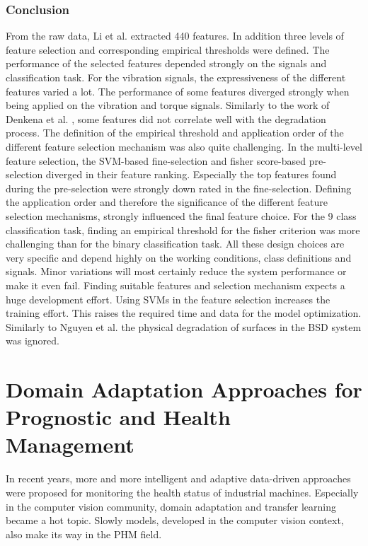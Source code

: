 \subsubsection{Conclusion}
From the raw data, Li et al. \cite{LiPin2018} extracted 440 features. In addition three levels of feature selection and corresponding empirical thresholds were defined. The performance of the selected features depended strongly on the signals and classification task. For the vibration signals, the expressiveness of the different features varied a lot. The performance of some features diverged strongly when being applied on the vibration and torque signals. Similarly to the work of Denkena et al. \cite{Denkena2021}, some features did not correlate well with the degradation process. The definition of the empirical threshold and application order of the different feature selection mechanism was also quite challenging. In the multi-level feature selection, the SVM-based fine-selection and fisher score-based pre-selection diverged in their feature ranking. Especially the top features found during the pre-selection were strongly down rated in the fine-selection. Defining the application order and therefore the significance of the different feature selection mechanisms, strongly influenced the final feature choice. For the 9 class classification task, finding an empirical threshold for the fisher criterion was more challenging than for the binary classification task. All these design choices are very specific and depend highly on the working conditions, class definitions and signals. Minor variations will most certainly reduce the system performance or make it even fail. Finding suitable features and selection mechanism expects a huge development effort. Using SVMs in the feature selection increases the training effort. This raises the required time and data for the model optimization. Similarly to Nguyen et al. \cite{NGUYEN2019} the physical degradation of surfaces in the BSD system was ignored. 


\section{Domain Adaptation Approaches for Prognostic and Health Management}
In recent years, more and more intelligent and adaptive data-driven approaches were proposed for monitoring the health status of industrial machines. Especially in the computer vision community, domain adaptation and transfer learning became a hot topic. Slowly models, developed in the computer vision context, also make its way in the PHM field.

